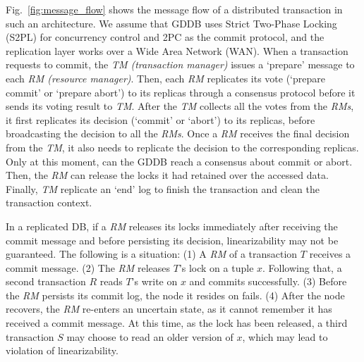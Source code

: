 \documentclass[conference]{IEEEtran}
\begin{document}
Fig.~\ref{fig:message_flow} shows the message flow of a distributed transaction in such an architecture. We assume that
GDDB uses Strict Two-Phase Locking (S2PL) for concurrency control and 2PC as the commit protocol, and the replication layer works over a Wide Area Network (WAN).
When a transaction requests to commit, the \emph{TM (transaction manager)} issues a `prepare' message to each \emph{RM (resource manager)}.
Then, each \emph{RM} replicates its vote (`prepare commit' or `prepare abort') to its replicas through a consensus protocol before it
sends its voting result to \emph{TM}.
After the \emph{TM} collects all the votes from the \emph{RMs}, it first replicates its decision (`commit' or `abort') to its replicas, before broadcasting the decision to all the \emph{RMs}.
Once a \emph{RM} receives the final decision from the \emph{TM}, it also needs to replicate the decision to the corresponding replicas.
Only at this moment, can the GDDB reach a consensus about commit or abort.
Then, the \emph{RM} can release the locks it had retained over the accessed data.
Finally, \emph{TM} replicate an `end' log to finish the transaction and clean the transaction context.

In a replicated DB, if a \emph{RM} releases its locks immediately after receiving the commit message and before persisting its decision, linearizability may not be guaranteed. 
The following is a situation:
(1) A \emph{RM} of a transaction ${T}$ receives a commit message.
(2) The \emph{RM} releases ${T}$'s lock on a tuple ${x}$. Following that,
a second transaction ${R}$ reads ${T}$'s write on ${x}$ and commits successfully.
(3) Before the \emph{RM} persists its commit log, the node it resides on fails. 
(4) After the node recovers, the \emph{RM} re-enters an uncertain state, as it cannot remember it has received a commit message. At this time, as the lock has been released, a third transaction ${S}$ may choose to read an older version of ${x}$, which may lead to violation of linearizability.
\end{document}
